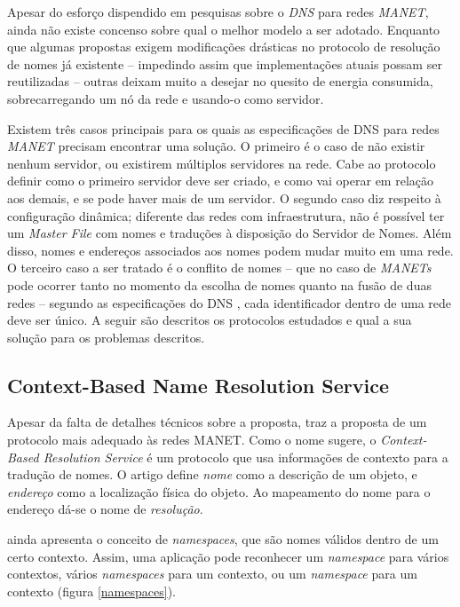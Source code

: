 
Apesar do esforço dispendido em pesquisas sobre o \textit{DNS} para redes 
\textit{MANET}, ainda não existe concenso sobre qual o melhor modelo a ser 
adotado. Enquanto que algumas propostas exigem modificações drásticas no 
protocolo de resolução de nomes já existente -- impedindo assim que 
implementações atuais possam ser reutilizadas -- outras deixam muito a desejar 
no quesito de energia consumida, sobrecarregando um nó da rede e usando-o como
 servidor.

Existem três casos principais para os quais as especificações de DNS para redes 
\textit{MANET} precisam encontrar uma solução. O primeiro é o caso de não existir 
nenhum servidor, ou existirem múltiplos servidores na rede. Cabe ao protocolo 
definir como o primeiro servidor deve ser criado, e como vai operar em relação 
aos demais, e se pode haver mais de um servidor. O segundo caso diz respeito à 
configuração dinâmica; diferente das redes com infraestrutura, não é possível 
ter um \textit{Master File} com nomes e traduções à disposição do Servidor de 
Nomes. Além disso, nomes e endereços associados aos nomes podem mudar muito em 
uma rede. O terceiro caso a ser tratado é o conflito de nomes -- que no caso de 
\textit{MANETs} pode ocorrer tanto no momento da escolha de nomes quanto na fusão
 de duas redes -- segundo as especificações do DNS \cite{rfc1035}, cada 
 identificador dentro de uma rede deve ser único. A seguir são descritos os 
 protocolos estudados e qual a sua solução para os problemas descritos.

\subsection{Context-Based Name Resolution Service}
\label{context-based}

    Apesar da falta de detalhes técnicos sobre a proposta, \cite{context-dns}
    traz a proposta de um protocolo mais adequado às redes MANET. Como o nome
    sugere, o \textit{Context-Based Resolution Service} é um protocolo que usa
    informações de contexto para a tradução de nomes. O artigo define \emph{nome}
    como a descrição de um objeto, e \emph{endereço} como a localização física do
    objeto. Ao mapeamento do nome para o endereço dá-se o nome de \emph{resolução}.
    
    \cite{context-dns} ainda apresenta o conceito de \textit{namespaces}, que são
    nomes válidos dentro de um certo contexto. Assim, uma aplicação pode reconhecer
    um \textit{namespace} para vários contextos, vários \textit{namespaces} para
    um contexto, ou um \textit{namespace} para um contexto (figura \ref{namespaces}).
    
